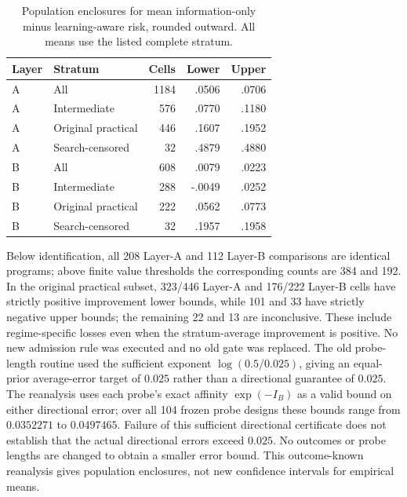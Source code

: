 \documentclass[journal]{IEEEtran}
\begin{document}
\begin{table}[t]
\centering
\caption{Population enclosures for mean information-only minus learning-aware risk, rounded outward.
All means use the listed complete stratum.}
\begin{tabular}{llrrr}
\toprule
Layer & Stratum & Cells & Lower & Upper\\
\midrule
A & All & 1184 & .0506 & .0706\\
A & Intermediate & 576 & .0770 & .1180\\
A & Original practical & 446 & .1607 & .1952\\
A & Search-censored & 32 & .4879 & .4880\\
B & All & 608 & .0079 & .0223\\
B & Intermediate & 288 & -.0049 & .0252\\
B & Original practical & 222 & .0562 & .0773\\
B & Search-censored & 32 & .1957 & .1958\\
\bottomrule
\end{tabular}
\end{table}
Below identification, all 208 Layer-A and 112 Layer-B comparisons are identical programs; above finite value thresholds the corresponding counts are 384 and 192.
In the original practical subset, 323/446 Layer-A and 176/222 Layer-B cells have strictly positive improvement lower bounds, while 101 and 33 have strictly negative upper bounds; the remaining 22 and 13 are inconclusive.
These include regime-specific losses even when the stratum-average improvement is positive.
No new admission rule was executed and no old gate was replaced.
The old probe-length routine used the sufficient exponent $\log(0.5/0.025)$, giving an equal-prior average-error target of $0.025$ rather than a directional guarantee of $0.025$.
The reanalysis uses each probe's exact affinity $\exp(-I_B)$ as a valid bound on either directional error; over all 104 frozen probe designs these bounds range from $0.0352271$ to $0.0497465$.
Failure of this sufficient directional certificate does not establish that the actual directional errors exceed $0.025$.
No outcomes or probe lengths are changed to obtain a smaller error bound.
This outcome-known reanalysis gives population enclosures, not new confidence intervals for empirical means.
\end{document}
